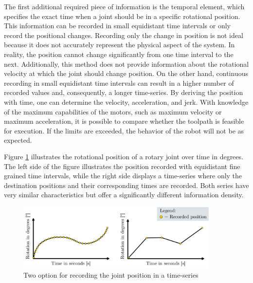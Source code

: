 The first additional required piece of information is the temporal element, which specifies the exact time when a joint should be in a specific rotational position. This information can be recorded in small equidistant time intervals or only record the positional changes. Recording only the change in position is not ideal because it does not accurately represent the physical aspect of the system. In reality, the position cannot change significantly from one time interval to the next. Additionally, this method does not provide information about the rotational velocity at which the joint should change position. On the other hand, continuous recording in small equidistant time intervals can result in a higher number of recorded values and, consequently, a longer time-series. By deriving the position with time, one can determine the velocity, acceleration, and jerk. With knowledge of the maximum capabilities of the motors, such as maximum velocity or maximum acceleration, it is possible to compare whether the toolpath is feasible for execution. If the limits are exceeded, the behavior of the robot will not be as expected.

Figure \ref{equi} illustrates the rotational position of a rotary joint over time in degrees. The left side of the figure illustrates the position recorded with equidistant fine grained time intervals, while the right side displays a time-series where only the destination positions and their corresponding times are recorded. Both series have very similar characteristics but offer a significantly different information density.


\begin{figure}[H]
	\centerline{\includegraphics[width=0.90\textwidth]{figures/equionchange.png}}
	\caption{Two option for recording the joint position in a time-series}
	\label{equi}
\end{figure}



